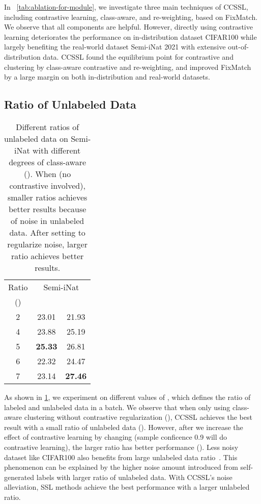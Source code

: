 \documentclass[10pt,twocolumn,letterpaper]{article}
\begin{document}
In ~\cref{tab:ablation-for-module}, we investigate three main techniques of CCSSL, including contrastive learning, class-aware, and re-weighting, based on FixMatch. We observe that all components are helpful. However, directly using contrastive learning deteriorates the performance on in-distribution dataset CIFAR100 while largely benefiting the real-world dataset Semi-iNat 2021 with extensive out-of-distribution data. CCSSL found the equilibrium point for contrastive and clustering by class-aware contrastive and re-weighting, and improved FixMatch by a large margin on both in-distribution and real-world datasets.

\subsection{Ratio of Unlabeled Data}

\begin{table}
\centering
\small
\begin{tabular}{c|c|c}
\toprule
Ratio & \multicolumn{2}{c}{Semi-iNat}  \\
() &  &  \\
\midrule
2 & 23.01 & 21.93 \\
4 & 23.88 & 25.19 \\
5 & \textbf{25.33} & 26.81 \\
6 & 22.32 & 24.47 \\
7 & 23.14 & \textbf{27.46} \\
\bottomrule
\end{tabular}
\caption{Different ratios of unlabeled data on Semi-iNat with different degrees of class-aware (). When  (no contrastive involved), smaller ratios achieves better results because of noise in unlabeled data. After setting  to regularize noise, larger ratio achieves better results.}
\label{tab:ablation-for-mu}
\end{table}
As shown in \cref{tab:ablation-for-mu}, we experiment on different values of , which defines the ratio of labeled and unlabeled data in a batch. We observe that when only using class-aware clustering without contrastive regularization (),  CCSSL achieves the best result with a small ratio of unlabeled data (). However, after we increase the effect of contrastive learning by changing  (sample conficence  0.9 will do contrastive learning), the larger ratio has better performance (). Less noisy dataset like CIFAR100 also benefits from large unlabeled data ratio~\cite{nassar2021labels}. This phenomenon can be explained by the higher noise amount introduced from self-generated labels with larger ratio of unlabeled data. With CCSSL's noise alleviation, SSL methods achieve the best performance with a larger unlabeled ratio.
\end{document}
